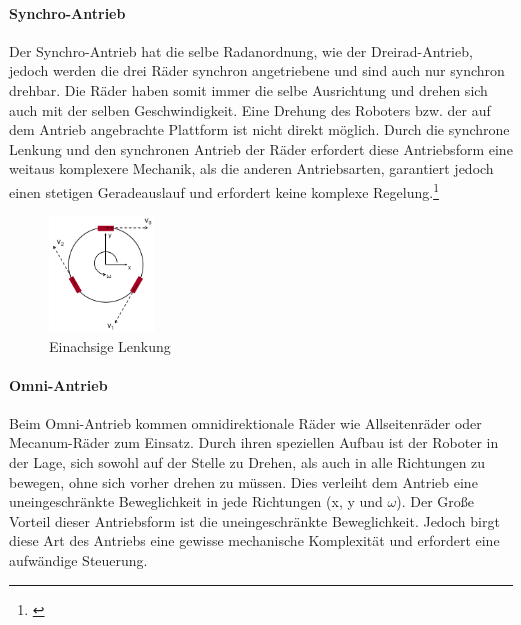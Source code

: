 \paragraph{Synchro-Antrieb}
Der Synchro-Antrieb hat die selbe Radanordnung, wie der Dreirad-Antrieb, jedoch werden die drei Räder synchron angetriebene und sind auch nur synchron drehbar. Die Räder haben somit immer die selbe Ausrichtung und drehen sich auch mit der selben Geschwindigkeit. Eine Drehung des Roboters bzw. der auf dem Antrieb angebrachte Plattform ist nicht direkt möglich.
\newline
Durch die synchrone Lenkung und den synchronen Antrieb der Räder erfordert diese Antriebsform eine weitaus komplexere Mechanik, als die anderen Antriebsarten, garantiert jedoch einen stetigen Geradeauslauf und erfordert keine komplexe Regelung.\footnote{\citep[vgl.][Mobile Roboter, Seite 107 f.]{Hertzberg.MobileRoboter}\label{note22}}
\begin{figure}
	\vspace{-0.5cm}
	\begin{center}
		\includegraphics[width=0.25\textwidth]{images/technische_grundlagen/Omniantrieb.png}
	\end{center}
	\caption{Einachsige Lenkung}
	\label{fig:einachsenlenkung}
\end{figure}
\paragraph{Omni-Antrieb}
Beim Omni-Antrieb kommen omnidirektionale Räder wie Allseitenräder oder Mecanum-Räder zum Einsatz. Durch ihren speziellen Aufbau ist der Roboter in der Lage, sich sowohl auf der Stelle zu Drehen, als auch in alle Richtungen zu bewegen, ohne sich vorher drehen zu müssen. Dies verleiht dem Antrieb eine uneingeschränkte Beweglichkeit in jede Richtungen (x, y und $\omega{}$).
\newline
Der Große Vorteil dieser Antriebsform ist die uneingeschränkte Beweglichkeit. Jedoch birgt diese Art des Antriebs eine gewisse mechanische Komplexität und erfordert eine aufwändige Steuerung.


